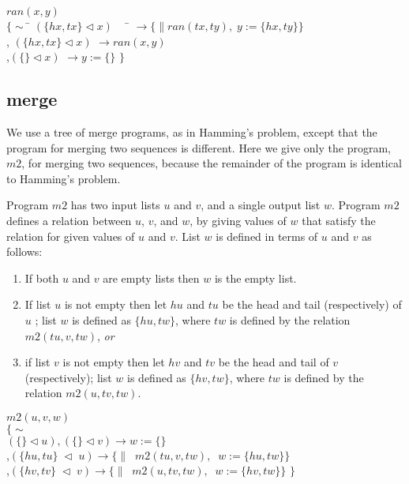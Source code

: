 \begin{tabbing}
$ran(x,y)$ \\
$\{\sim$ \=
$(\{ hx , tx \} \lhd x)$ $\; \; \;$ \= $\rightarrow \{\| ran(tx,ty), \;
                  y := \{ hx , ty \} \}$ \\
,\> $(\{ hx , tx \} \lhd x)$ \> $\rightarrow  ran(x,y) $  \\ 
,$(\{\} \lhd x)$ \>  $\rightarrow y := \{\}$            
$\}$
\end{tabbing}


\subsection{merge}
We use a tree of merge programs, as in Hamming's problem, except that
the program for merging two sequences is different.
Here we give only the program, $m2$, for merging two sequences, because
the remainder of the program is identical to Hamming's problem.

Program $m2$ has two input lists $u$ and $v$, and a single output list $w$.
Program $m2$ defines a relation between $u$, $v$, and $w$,
by giving values of $w$ that satisfy the relation
for given values of $u$ and $v$.
List $w$ is defined in terms of $u$ and $v$ as follows:

\begin{enumerate}
\item If both $u$ and $v$ are empty lists then $w$ is the empty list.
\item If list $u$ is not empty then let $hu$ and $tu$ 
      be the head and tail (respectively) of  $u$ ; 
      list $w$ is defined as $\{hu,tw\}$, where $tw$ is defined
      by the relation $m2(tu,v,tw)$, {\em or}
\item if list $v$ is not empty then let $hv$ and $tv$ 
      be the head and tail of $v$ (respectively); 
      list $w$ is defined as $\{hv,tw\}$, where $tw$ is defined
      by the relation $m2(u,tv,tw)$.
\end{enumerate}
\begin{tabbing}
$m2(u,v,w)$ \\
$\{ \sim$ \\
$(\{\} \lhd u),(\{\} \lhd v) \rightarrow w:= \{\} $ \\
,$(\{ hu , tu \} \; \lhd \; u)  \rightarrow  
\{ \| \; \; m2(tu,v,tw),\; \; w := \{ hu , tw \} \}$ \\
,$(\{ hv , tv \} \; \lhd \; v)  \rightarrow  
\{ \| \; \; m2(u,tv,tw),\; \; w := \{ hv , tw \} \}$
$\}$
\end{tabbing}  

